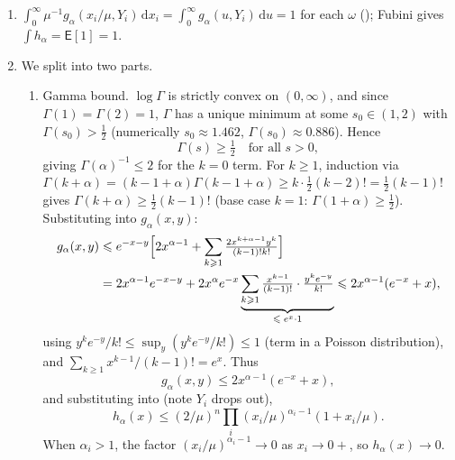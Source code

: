 \documentclass[14pt]{extarticle}
\makeatletter
\theoremstyle{definition}
\renewenvironment{proof}[1][\proofname]{\par
  \pushQED{\qed}%
  \normalfont \topsep6\p@\@plus6\p@\relax
  \trivlist
  \item[\hskip\labelsep\bfseries #1\@addpunct{.}]\ignorespaces
}{%
  \popQED\endtrivlist\@endpefalse
}
\newcommand{\EE}{\mathsf{E}}
\newcommand{\dd}{\mathrm{d}}
\makeatother
\begin{document}
\begin{proof}
  \leavevmode
  \begin{enumerate}[label=(\roman*)]
    \item $\int_0^\infty\mu^{-1}g_\alpha(x_i/\mu,Y_i)\,\dd x_i
      =\int_0^\infty g_\alpha(u,Y_i)\,\dd u=1$ for each $\omega$
      (); Fubini gives
      $\int h_\alpha=\EE[1]=1$.

    \item We split into two parts.
      \begin{enumerate}
        \item Gamma bound.  $\log\Gamma$ is strictly convex on
          $(0,\infty)$, and since $\Gamma(1)=\Gamma(2)=1$, $\Gamma$ has
          a unique minimum at some $s_0\in(1,2)$ with $\Gamma(s_0)>\tfrac12$
          (numerically $s_0\approx 1.462$, $\Gamma(s_0)\approx 0.886$).
          Hence
          \begin{equation}\label{eq:gamma_lb}
            \Gamma(s)\geqslant\tfrac12\quad\text{for all }s>0,
          \end{equation}
          giving $\Gamma(\alpha)^{-1}\leqslant 2$ for the $k=0$ term.
          For $k\geqslant 1$, induction via
          $\Gamma(k+\alpha)=(k-1+\alpha)\Gamma(k-1+\alpha)\geqslant
          k\cdot\tfrac12(k-2)!=\tfrac12(k-1)!$ gives
          $\Gamma(k+\alpha)\geqslant\tfrac12(k-1)!$ (base case $k=1$:
          $\Gamma(1+\alpha)\geqslant\tfrac12$).  Substituting into
          $g_\alpha(x,y)$:
          \begin{align*}
            g_\alpha(x,y)
            &\leqslant e^{-x-y}\Bigl[2x^{\alpha-1}
              +\sum_{k\geqslant 1}\tfrac{2x^{k+\alpha-1}y^k}{(k-1)!k!}\Bigr]\\
            &=2x^{\alpha-1}e^{-x-y}
              +2x^\alpha e^{-x}\underbrace{\sum_{k\geqslant 1}\tfrac{x^{k-1}}{(k-1)!}
              \cdot\tfrac{y^ke^{-y}}{k!}}_{\leqslant\;e^x\cdot 1}
            \leqslant 2x^{\alpha-1}(e^{-x}+x),
          \end{align*}
          using $y^ke^{-y}/k!\leqslant\sup_y(y^ke^{-y}/k!)\leqslant 1$
          (term in a Poisson distribution), and
          $\sum_{k\geqslant 1}x^{k-1}/(k-1)!=e^x$.  Thus
          \begin{equation}\label{eq:gbound}
            g_\alpha(x,y)\leqslant 2x^{\alpha-1}(e^{-x}+x),
          \end{equation}
          and substituting into  (note $Y_i$ drops out),
          \begin{equation}\label{eq:hbound}
            h_\alpha(x)\leqslant(2/\mu)^n\prod_{i}(x_i/\mu)^{\alpha_i-1}(1+x_i/\mu).
          \end{equation}
          When $\alpha_i>1$, the factor $(x_i/\mu)^{\alpha_i-1}\to 0$
          as $x_i\to 0+$, so $h_\alpha(x)\to 0$.


\end{enumerate}
\end{enumerate}
\end{proof}
\end{document}

